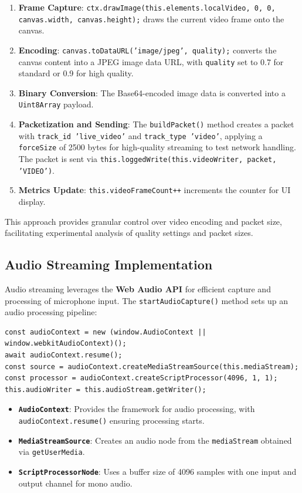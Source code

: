 \begin{enumerate}
    \item \textbf{Frame Capture}: \texttt{ctx.drawImage(this.elements.localVideo, 0, 0, canvas.width, canvas.height);} draws the current video frame onto the canvas.
    \item \textbf{Encoding}: \texttt{canvas.toDataURL('image/jpeg', quality);} converts the canvas content into a JPEG image data URL, with \texttt{quality} set to 0.7 for standard or 0.9 for high quality.
    \item \textbf{Binary Conversion}: The Base64-encoded image data is converted into a \texttt{Uint8Array} payload.
    \item \textbf{Packetization and Sending}: The \texttt{buildPacket()} method creates a packet with \texttt{track\_id 'live\_video'} and \texttt{track\_type 'video'}, applying a \texttt{forceSize} of 2500 bytes for high-quality streaming to test network handling. The packet is sent via \texttt{this.loggedWrite(this.videoWriter, packet, 'VIDEO')}.
    \item \textbf{Metrics Update}: \texttt{this.videoFrameCount++} increments the counter for UI display.
\end{enumerate}

This approach provides granular control over video encoding and packet size, facilitating experimental analysis of quality settings and packet sizes.

\subsection{Audio Streaming Implementation}
Audio streaming leverages the \textbf{Web Audio API} for efficient capture and processing of microphone input. The \texttt{startAudioCapture()} method sets up an audio processing pipeline:

\begin{lstlisting}[breaklines=true,basicstyle=\small\ttfamily,frame=single]
const audioContext = new (window.AudioContext || window.webkitAudioContext)();
await audioContext.resume();
const source = audioContext.createMediaStreamSource(this.mediaStream);
const processor = audioContext.createScriptProcessor(4096, 1, 1);
this.audioWriter = this.audioStream.getWriter();
\end{lstlisting}

\begin{itemize}
    \item \textbf{\texttt{AudioContext}}: Provides the framework for audio processing, with \texttt{audioContext.resume()} ensuring processing starts.
    \item \textbf{\texttt{MediaStreamSource}}: Creates an audio node from the \texttt{mediaStream} obtained via \texttt{getUserMedia}.
    \item \textbf{\texttt{ScriptProcessorNode}}: Uses a buffer size of 4096 samples with one input and output channel for mono audio.
\end{itemize}

